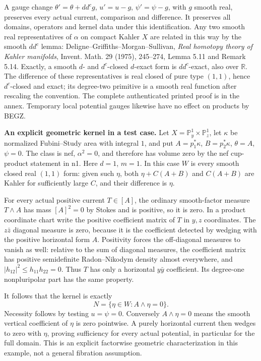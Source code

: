 \documentclass[
  11pt,
]{article}
\begin{document}
A gauge change \(\theta' =\theta+dd^cg\), \(u'=u-g\), \(\psi'=\psi-g\),
with \(g\) smooth real, preserves every actual current, comparison and
difference. It preserves all domains, operators and kernel data under
this identification. Any two smooth real representatives of \(\alpha\)
on compact Kahler \(X\) are related in this way by the smooth \(dd^c\)
lemma: Deligne--Griffiths--Morgan--Sullivan, \emph{Real homotopy theory
of Kahler manifolds}, Invent. Math. 29 (1975), 245--274, Lemma 5.11 and
Remark 5.14. Exactly, a smooth \(d\)- and \(d^c\)-closed \(d\)-exact
form is \(dd^c\)-exact, also over \(\mathbb{R}\). The difference of these
representatives is real closed of pure type \((1,1)\), hence
\(d^c\)-closed and exact; its degree-two primitive is a smooth real
function after rescaling the convention. The complete authenticated
printed proof is in the annex. Temporary local potential gauges likewise
have no effect on products by BEGZ.

\textbf{An explicit geometric kernel in a test case.} Let
\(X=\mathbb{P}^1_y\times\mathbb{P}^1_z\), let \(\kappa\) be normalized
Fubini--Study area with integral \(1\), and put \(A=p_1^*\kappa\),
\(B=p_2^*\kappa\), \(\theta=A\), \(\psi=0\). The class is nef,
\(\alpha^2=0\), and therefore has volume zero by the nef cup-product
statement in n1. Here \(d=1\), \(m=1\). In this case \(W\) is every
smooth closed real \((1,1)\) form: given such \(\eta\), both
\(\eta+C(A+B)\) and \(C(A+B)\) are Kahler for sufficiently large \(C\),
and their difference is \(\eta\).

For every actual positive current \(T\in[A]\), the ordinary
smooth-factor measure \(T\wedge A\) has mass \([A]^2=0\) by Stokes and
is positive, so it is zero. In a product coordinate chart write the
positive coefficient matrix of \(T\) in \(y,z\) coordinates. The
\(z\bar z\) diagonal measure is zero, because it is the coefficient
detected by wedging with the positive horizontal form \(A\). Positivity
forces the off-diagonal measures to vanish as well: relative to the sum
of diagonal measures, the coefficient matrix has positive semidefinite
Radon--Nikodym density almost everywhere, and
\(|h_{12}|^2\leq h_{11}h_{22}=0\). Thus \(T\) has only a horizontal
\(y\bar y\) coefficient. Its degree-one nonpluripolar part has the same
property.

It follows that the kernel is exactly \[
N=\{\eta\in W:A\wedge\eta=0\}. \tag{Q6}
\] Necessity follows by testing \(u=\psi=0\). Conversely
\(A\wedge\eta=0\) means the smooth vertical coefficient of \(\eta\) is
zero pointwise. A purely horizontal current then wedges to zero with
\(\eta\), proving sufficiency for every actual potential, in particular
for the full domain. This is an explicit factorwise geometric
characterization in this example, not a general fibration assumption.
\end{document}
